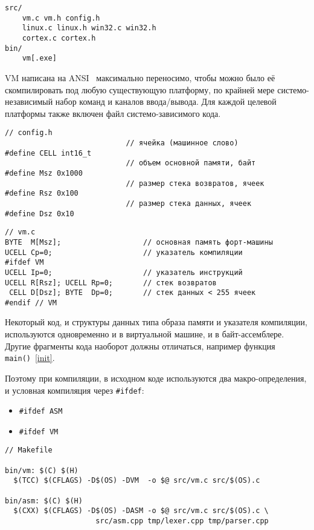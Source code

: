 \clearpage
{}\label{vm}\secdown

\begin{verbatim}
src/
    vm.c vm.h config.h
    linux.c linux.h win32.c win32.h
    cortex.c cortex.h
bin/
    vm[.exe]
\end{verbatim}

\noindent
VM написана на ANSI \ci\ максимально переносимо, чтобы можно было её
скомпилировать под любую существующую платформу, по крайней мере
системо-независимый набор команд и каналов ввода/вывода. Для каждой целевой
платформы также включен файл системо-зависимого кода.

\clearpage
\begin{verbatim}// config.h
                            // ячейка (машинное слово)
#define CELL int16_t
                            // объем основной памяти, байт
#define Msz 0x1000
                            // размер стека возвратов, ячеек
#define Rsz 0x100
                            // размер стека данных, ячеек
#define Dsz 0x10
\end{verbatim}

\clearpage
{}
\begin{verbatim}// vm.c
BYTE  M[Msz];                   // основная память форт-машины
UCELL Cp=0;                     // указатель компиляции
#ifdef VM
UCELL Ip=0;                     // указатель инструкций
UCELL R[Rsz]; UCELL Rp=0;       // стек возвратов
 CELL D[Dsz]; BYTE  Dp=0;       // стек данных < 255 ячеек
#endif // VM
\end{verbatim}

Некоторый код, и структуры данных типа образа памяти и указателя компиляции,
используются одновременно и в виртуальной машине, и в байт-ассемблере. Другие
фрагменты кода наоборот должны отличаться, например функция
\verb|main()|\ \ref{init}.

\clearpage
Поэтому при компиляции, в исходном коде используются два макро-определения, и
условная компиляция через \verb|#ifdef|:
\begin{itemize}
    \item \verb|#ifdef ASM|
    \item \verb|#ifdef VM|
\end{itemize}

\begin{verbatim}// Makefile

bin/vm: $(C) $(H)
  $(TCC) $(CFLAGS) -D$(OS) -DVM  -o $@ src/vm.c src/$(OS).c

bin/asm: $(C) $(H)
  $(CXX) $(CFLAGS) -D$(OS) -DASM -o $@ src/vm.c src/$(OS).c \
                     src/asm.cpp tmp/lexer.cpp tmp/parser.cpp
\end{verbatim}

